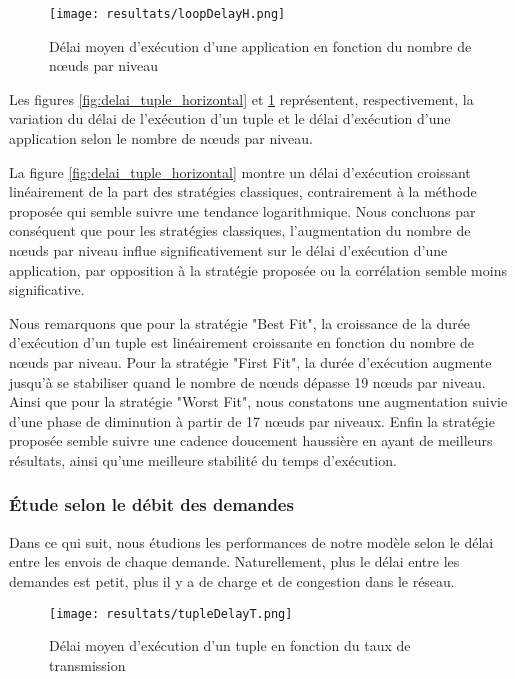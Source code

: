 \begin{figure}[H]
  \centering
  \texttt{[image: resultats/loopDelayH.png]}
  \caption{Délai moyen d'exécution d'une application en fonction du nombre de nœuds par niveau}
  \label{fig:delai_application_horizontal}
\end{figure}

Les figures \ref{fig:delai_tuple_horizontal} et \ref{fig:delai_application_horizontal} représentent, respectivement, la variation du délai de l'exécution d'un tuple et le délai d'exécution d'une application selon le nombre de nœuds par niveau.\par
La figure \ref{fig:delai_tuple_horizontal} montre un délai d'exécution croissant linéairement de la part des stratégies classiques, contrairement à la méthode proposée qui semble suivre une tendance logarithmique. Nous concluons par conséquent que pour les stratégies classiques, l'augmentation du nombre de nœuds par niveau influe significativement sur le délai d'exécution d'une application, par opposition à la stratégie proposée ou la corrélation semble moins significative.\par
Nous remarquons que pour la stratégie "Best Fit", la croissance de la durée d'exécution d'un tuple est linéairement croissante en fonction du nombre de nœuds par niveau. Pour la stratégie "First Fit", la durée d'exécution augmente jusqu'à se stabiliser quand le nombre de nœuds dépasse 19 nœuds par niveau. Ainsi que pour la stratégie "Worst Fit", nous constatons une augmentation suivie d'une phase de diminution à partir de 17 nœuds par niveaux. Enfin la stratégie proposée semble suivre une cadence doucement haussière en ayant de meilleurs résultats, ainsi qu'une meilleure stabilité du temps d'exécution.

\subsubsection{Étude selon le débit des demandes}
Dans ce qui suit, nous étudions les performances de notre modèle selon le délai entre les envois de chaque demande. Naturellement, plus le délai entre les demandes est petit, plus il y a de charge et de congestion dans le réseau.

\begin{figure}[H]
  \centering
  \texttt{[image: resultats/tupleDelayT.png]}
  \caption{Délai moyen d'exécution d'un tuple en fonction du taux de transmission}
  \label{fig:delai_tuple_debit}
\end{figure}

